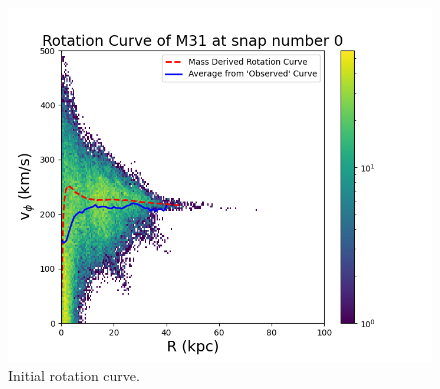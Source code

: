 \documentclass[twocolumn,linenumbers,trackchanges]{aastex7}
\begin{document}
\begin{figure}[ht!]
	\centering
	\includegraphics[width=1.0\linewidth]{M31_000_rotation_curve.png}
	\caption{Initial rotation curve.}
\end{figure}
\end{document}
